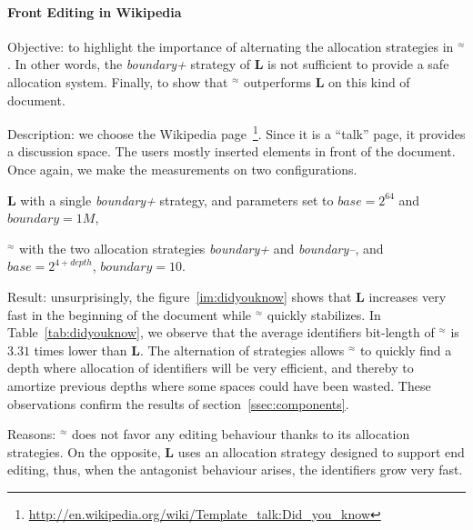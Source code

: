 \paragraph{Front Editing in Wikipedia}
\begin{asparadesc}
  
\item[Objective:] to highlight the importance of alternating the allocation
  strategies in \textbf{\NAME{}}$^\approx$. In other words, the
  \emph{boundary+} strategy of \textbf{L} is not sufficient to provide a safe
  allocation system. Finally, to show that \textbf{\NAME{}}$^\approx$
  outperforms \textbf{L} on this kind of document.

  \item[Description:] we choose the Wikipedia
    page~\footnote{\url{http://en.wikipedia.org/wiki/Template_talk:Did_you_know}}. Since
    it is a ``talk'' page, it provides a discussion space. The users mostly
    inserted elements in front of the document. Once again, we make the
    measurements on two configurations.
  \begin{inparaenum}[(1)]
    \item \textbf{L} with a single \emph{boundary+} strategy, and parameters
      set to $base=2^{64}$ and $boundary=1M$,
    \item \textbf{\NAME{}}$^\approx$ with the two allocation strategies
      \emph{boundary+} and \emph{boundary--}, and $base=2^{4+depth}$,
      $boundary=10$.
  \end{inparaenum}

  \item[Result:] unsurprisingly, the figure~\ref{im:didyouknow} shows that
    \textbf{L} increases very fast in the beginning of the document while
    \textbf{\NAME{}}$^\approx$ quickly stabilizes. In
    Table~\ref{tab:didyouknow}, we observe that the average identifiers
    bit-length of \textbf{\NAME{}}$^\approx$ is $3.31$ times lower than
    \textbf{L}.  The alternation of strategies allows
    \textbf{\NAME{}}$^\approx$ to quickly find a depth where allocation of
    identifiers will be very efficient, and thereby to amortize previous depths
    where some spaces could have been wasted.  These observations confirm the
    results of section~\ref{ssec:components}.
  
  \item[Reasons:] \textbf{\NAME{}}$^\approx$ does not favor any editing
    behaviour thanks to its allocation strategies. On the opposite, \textbf{L}
    uses an allocation strategy designed to support end editing, thus, when
    the antagonist behaviour arises, the identifiers grow very fast.
\end{asparadesc}

